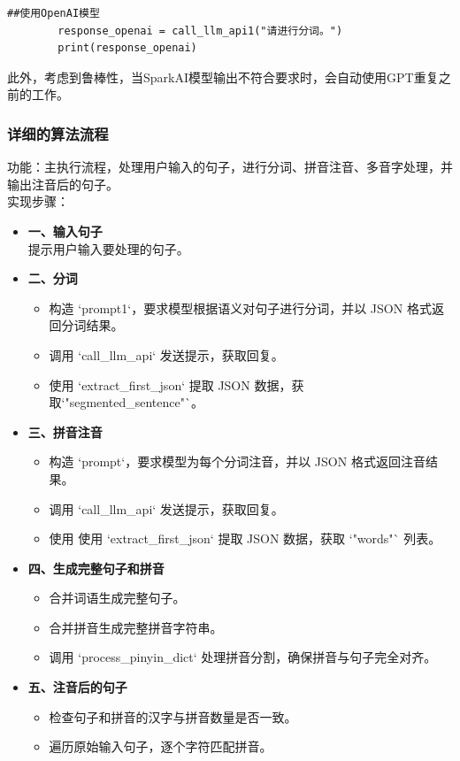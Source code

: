 \documentclass[12pt,hyperref,a4paper,UTF8]{ctexart}
\begin{document}
\begin{itemize}
\begin{lstlisting}[caption={使用示例代码}, label={lst3}]
        ##使用OpenAI模型
        response_openai = call_llm_api1("请进行分词。")
        print(response_openai)
        \end{lstlisting}
    此外，考虑到鲁棒性，当SparkAI模型输出不符合要求时，会自动使用GPT重复之前的工作。
\end{itemize}
\subsubsection{详细的算法流程}
功能：主执行流程，处理用户输入的句子，进行分词、拼音注音、多音字处理，并输出注音后的句子。\\
\indent 实现步骤：
\begin{itemize}
  \item \textbf{一、输入句子}\\
  提示用户输入要处理的句子。
  \item \textbf{二、分词}
  \begin{itemize}
  \item 构造 `prompt1`，要求模型根据语义对句子进行分词，并以 JSON 格式返回分词结果。
  \item 调用 `call\_llm\_api` 发送提示，获取回复。
  \item 使用 `extract\_first\_json` 提取 JSON 数据，获取`"segmented\_sentence"`。
\end{itemize}
  \item \textbf{三、拼音注音}
  \begin{itemize}
  \item 构造 `prompt`，要求模型为每个分词注音，并以 JSON 格式返回注音结果。
  \item 调用 `call\_llm\_api` 发送提示，获取回复。
  \item 使用 使用 `extract\_first\_json` 提取 JSON 数据，获取 `"words"` 列表。
\end{itemize}
  \item \textbf{四、生成完整句子和拼音}
  \begin{itemize}
  \item 合并词语生成完整句子。
  \item 合并拼音生成完整拼音字符串。
  \item 调用 `process\_pinyin\_dict` 处理拼音分割，确保拼音与句子完全对齐。
\end{itemize}
  \item \textbf{五、注音后的句子}
  \begin{itemize}
  \item 检查句子和拼音的汉字与拼音数量是否一致。
  \item 遍历原始输入句子，逐个字符匹配拼音。

\end{itemize}
\end{itemize}
\end{document}
